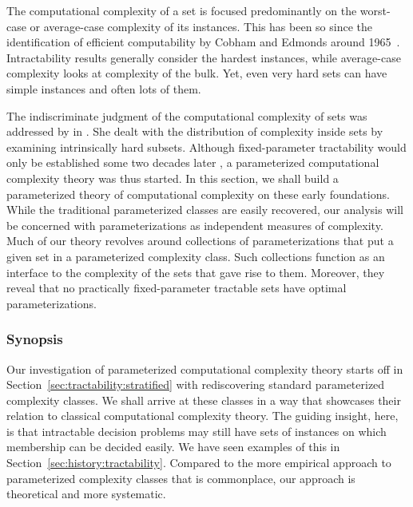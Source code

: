 \label{sec:tractability}%

The computational complexity of a set is focused predominantly on the worst-case or average-case complexity of its instances.
This has been so since the identification of efficient computability by Cobham and Edmonds around 1965~\parencite[for some background, see][]{goldreich2008computational}.
Intractability results \parencite{cook1971complexity,garey1979computers} generally consider the hardest instances, while average-case complexity looks at complexity of the bulk.
Yet, even very hard sets can have simple instances and often lots of them.

The indiscriminate judgment of the computational complexity of sets was addressed by \textcite{lynch1975reducibility} in \citeyear{lynch1975reducibility}.
She dealt with the distribution of complexity inside sets by examining intrinsically hard subsets.
Although fixed-parameter tractability would only be established some two decades later \parencite{downey1992fixed}, a parameterized computational complexity theory was thus started.
In this section, we shall build a parameterized theory of computational complexity on these early foundations.
While the traditional parameterized classes are easily recovered, our analysis will be concerned with parameterizations as independent measures of complexity.
Much of our theory revolves around collections of parameterizations that put a given set in a parameterized complexity class.
Such collections function as an interface to the complexity of the sets that gave rise to them.
Moreover, they reveal that no practically fixed-parameter tractable sets have optimal parameterizations.

\subsubsection{Synopsis}
Our investigation of parameterized computational complexity theory starts off in Section~\ref{sec:tractability:stratified} with rediscovering standard parameterized complexity classes.
We shall arrive at these classes in a way that showcases their relation to classical computational complexity theory.
The guiding insight, here, is that intractable decision problems may still have sets of instances on which membership can be decided easily.
We have seen examples of this in Section~\ref{sec:history:tractability}.
Compared to the more empirical approach to parameterized complexity classes that is commonplace, our approach is theoretical and more systematic.

